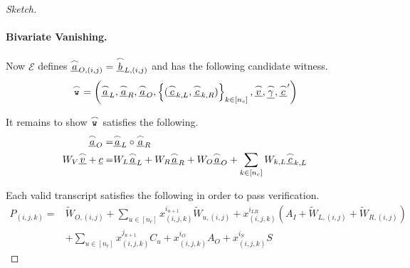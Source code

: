 \documentclass{article}
\theoremstyle{definition}
\begin{document}
\begin{proof}[Sketch]
\paragraph{Bivariate Vanishing.} Now
$\mathcal{E}$ defines $\underline{\overset{\LARGE \frown}{\small{a}}}_{O,(i,j)} = \underline{\overset{\LARGE \frown}{\small{b}}}_{L,(i,j)}$ and has the following candidate witness.
$$\overset{\LARGE \frown}{\small{\texttt{w}}} = \left(\underline{\overset{\LARGE \frown}{\small{a}}}_L, \underline{\overset{\LARGE \frown}{\small{a}}}_R, \underline{\overset{\LARGE \frown}{\small{a}}}_O, \left\{(\underline{\overset{\LARGE \frown}{\small{c}}}_{k,L}, \underline{\overset{\LARGE \frown}{\small{c}}}_{k,R})\right\}_{k \in [n_c]}, \underline{\overset{\LARGE \frown}{\small{v}}}, \underline{\overset{\LARGE \frown}{\small{\gamma}}},  \underline{\overset{\LARGE \frown}{\small{c}}}^\prime\right)$$

It remains to show $\overset{\LARGE \frown}{\small{\texttt{w}}}$ satisfies the following.
\begin{align}
\underline{\overset{\LARGE \frown}{\small{a}}}_{O} =& \underline{\overset{\LARGE \frown}{\small{a}}}_{L} \circ\underline{\overset{\LARGE \frown}{\small{a}}}_{R} \label{eqn:ac_sat} \\
W_V \underline{\overset{\LARGE \frown}{\small{v}}} + \underline{c} =& W_L \underline{\overset{\LARGE \frown}{\small{a}}}_L + W_{R} \underline{\overset{\LARGE \frown}{\small{a}}}_R + W_O \underline{\overset{\LARGE \frown}{\small{a}}}_O + \sum_{k \in [n_c]} W_{k,L} \underline{\overset{\LARGE \frown}{\small{c}}}_{k,L}\label{eqn:linear_constraints}
\end{align}

Each valid transcript satisfies the following in order to pass verification.
\begin{align*}
P_{(i,j,k)} =& \widetilde{W}_{O, (i,j)} + \sum_{u \in [n_c]} x_{(i,j,k)}^{i_{u+1}} \widetilde{W}_{u, (i,j)} + x_{(i,j,k)}^{i_{LR}}(A_I + \widetilde{W}_{L,(i,j)} + \widetilde{W}_{R,(i,j)}) \\& + \sum_{u \in [n_c]} x_{(i,j,k)}^{j_{u+1}} C_u + x_{(i,j,k)}^{i_O} A_O + x_{(i,j,k)}^{i_S} S
\end{align*}


\end{proof}
\end{document}
